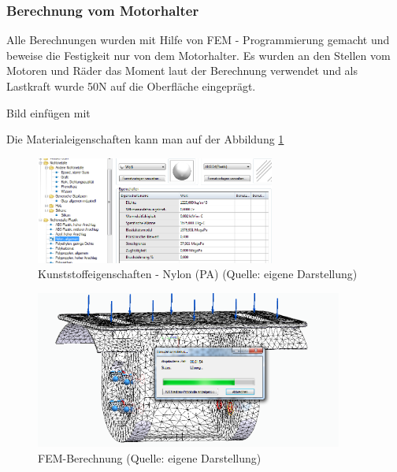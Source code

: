 \subsubsection{ Berechnung vom Motorhalter}

Alle Berechnungen wurden mit Hilfe von FEM - Programmierung gemacht und beweise die Festigkeit nur von dem Motorhalter. Es wurden an den Stellen vom Motoren und Räder das Moment laut der Berechnung %
 verwendet und als Lastkraft wurde 50N auf die Oberfläche eingeprägt. 

Bild einfügen mit %

Die Materialeigenschaften kann man auf der Abbildung \ref{FEM2}

\begin{figure}[!h]  %
	\centering\includegraphics[width=0.7\textwidth]{images/FEM2.png}
	\caption{Kunststoffeigenschaften - Nylon (PA) \newline (Quelle: eigene Darstellung)}
	\label{FEM2} %
\end{figure}

\begin{figure}[!h]  %
	\centering\includegraphics[width=0.9\textwidth]{images/FEM.png}
	\caption{FEM-Berechnung \newline (Quelle: eigene Darstellung)}
	\label{FEM1} %
\end{figure}



